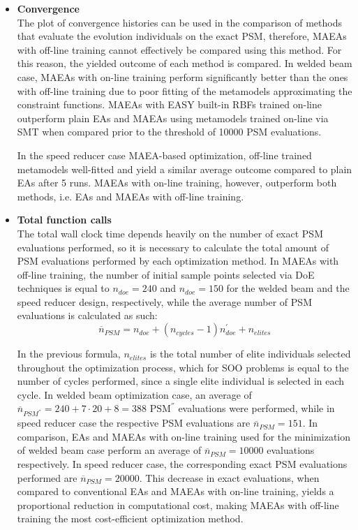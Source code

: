 \begin{itemize}

\item \textbf{Convergence} \\
The plot of convergence histories can be used in the 
comparison of methods that evaluate the evolution individuals on 
the exact PSM, therefore, MAEAs with off-line training cannot 
effectively be compared using this method. For this reason, the 
yielded outcome of each method is compared. In welded beam case,
MAEAs with on-line training perform significantly better 
than the ones with off-line training due to poor fitting of the 
metamodels approximating the constraint functions. MAEAs with 
EASY built-in RBFs trained on-line outperform plain EAs and 
MAEAs using metamodels trained on-line via SMT when 
compared prior to the threshold of 10000 PSM evaluations.

In the speed reducer case MAEA-based optimization, off-line trained 
metamodels well-fitted and yield a similar average outcome compared 
to plain EAs after 5 runs. MAEAs with on-line training, however, 
outperform both methods, i.e. EAs and MAEAs with off-line training. 


\item \textbf{Total function calls} \\
The total wall clock time depends heavily on the number of 
exact PSM evaluations performed, so it is necessary to calculate 
the total amount of PSM evaluations performed by each optimization 
method. In MAEAs with off-line training, the number of initial 
sample points selected via DoE techniques is equal to $n_{doe} \!= 
\!240$ and $n_{doe} \!= \!150$ for the welded beam and the speed 
reducer design, respectively, while the average number of PSM 
evaluations is calculated as such:
\begin{equation}
\overline{n}_{PSM} = n_{doe} + (n_{cycles} - 1)n_{doe}^{'} + 
n_{elites}
\end{equation}

In the previous formula, $n_{elites}$ is the total number of elite 
individuals selected throughout the optimization process, which 
for SOO problems is equal to the number of cycles performed, 
since a single elite individual is selected in each cycle. In 
welded beam optimization case, an average of $\overline{n}
_{PSM^{''}} = 240 + 7 \!\cdot \!20 + 8 = 388$ $\mathrm{PSM}^{''}$ 
evaluations were performed, while in speed reducer case the 
respective PSM evaluations are $\overline{n}_{PSM} = 151$. 
In comparison, EAs and MAEAs with on-line training used for the 
minimization of welded beam case perform an average of 
$\overline{n}_{PSM} \!= \!10000$ evaluations respectively. In speed 
reducer case, the corresponding exact PSM evaluations performed are 
$\overline{n}_{PSM} \!= \!20000$. This decrease in exact 
evaluations, when compared to conventional EAs and MAEAs with 
on-line training, yields a proportional reduction in computational 
cost, making MAEAs with off-line training the most cost-efficient 
optimization method.

\end{itemize}

